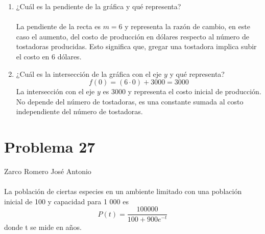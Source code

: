 \documentclass[12pt]{article}
\begin{document}
\begin{enumerate}
\item  ¿Cuál es la pendiente de la gráfica y qué representa?
\\ \\
La pendiente de la recta es $m=6$ y representa la razón de cambio, en este caso el aumento, del costo de producción en dólares respecto al número de tostadoras producidas. Esto significa que, gregar una tostadora implica subir el costo en 6 dólares.\\ 
 
\item  ¿Cuál es la intersección de la gráfica con el eje $y$ y qué representa?
\\
\[
f(0) = (6 \cdot 0) + 3000 = 3000
\]
La intersección con el eje $y$ es 3000 y representa el costo inicial de producción. No depende del número de tostadoras, es una constante sumada al costo independiente del número de tostadoras.
\\
\end{enumerate}

\section{Problema 27}
Zarco Romero José Antonio\\
\\
La población de ciertas especies en un ambiente limitado con una población inicial de 100 y capacidad para 1 000 es 
\[
P (t) = \frac{100 000}{100 + 900 e^{-t}} 
\]
donde t se mide en años.
\end{document}
